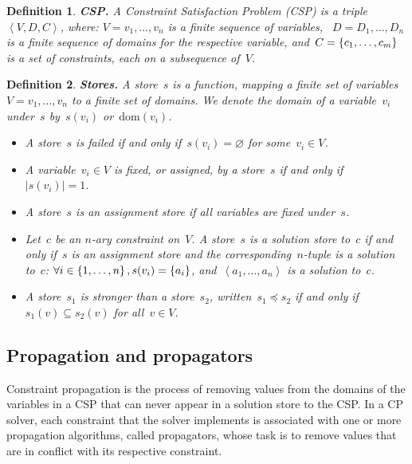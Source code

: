 \documentclass[a4paper,11pt]{article}
\newtheorem{definition}{Definition}
\newcommand{\Dom}[1]{\text{dom}({#1})}
\numberwithin{equation}{section}
\begin{document}
\begin{definition}
  \textbf{CSP.} A Constraint Satisfaction Problem (CSP) is a 
  triple~$\left<V,D,C\right>$, where:
  $V = v_1, \ldots, v_n$ is a finite sequence of variables,
  ~$D = D_1, \ldots, D_n$ is a finite sequence of domains for the respective variable,
  and~$C = \left\{c_1, \ldots, c_m\right\}$ is a set of constraints, each on a subsequence of~$V$.
\end{definition}

\begin{definition}
  \textbf{Stores.} A \emph{store}~$s$ is a function, mapping a finite set of
  variables~$V = v_1, \ldots, v_n$ to a finite set of domains. We denote the domain of
  a variable~$v_i$ under~$s$ by~$s(v_i)$ or~$\Dom{v_i}$.
  \begin{itemize}
    \item A store~$s$ is \emph{failed} if and only if~$s(v_i) = \varnothing$ for some~$v_i \in V$.
    \item   A variable~$v_i \in V$ is \emph{fixed}, or \emph{assigned},
      by a store~$s$ if and only if~$|s(v_i)| = 1$. 
    \item A store~$s$ is an \emph{assignment} store if all variables are 
      fixed under~$s$.

    \item Let~$c$ be an $n$-ary constraint on~$V$. A store~$s$ is 
      a \emph{solution store} 
      to~$c$ if and only if~$s$ is an assignment store and the
      corresponding~$n$-tuple is a solution to~$c$:
      $\forall i \in \left\{1,\ldots,n\right\}, s(v_i) = \left\{a_i\right\}$,
      and~$\left<a_1,\ldots,a_n\right>$ is a solution to~$c$.

    \item A store~$s_1$ is \emph{stronger} than a store~$s_2$, 
      written~$s_1 \preceq s_2$ if and only if~$s_1(v) \subseteq s_2(v)$ 
      for all~$v \in V$.
  \end{itemize}

\end{definition}

\subsection{Propagation and propagators}

Constraint propagation is the process of removing values from the domains
of the variables in a CSP that can never appear in a solution store to the 
CSP. In a CP solver, each constraint that the solver implements is associated with 
one or more propagation algorithms, called propagators, whose task is to remove
values that are in conflict with its respective constraint.
\end{document}
